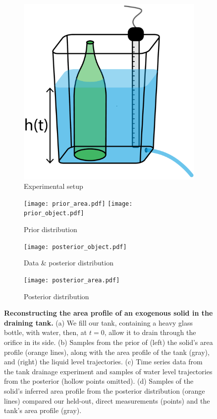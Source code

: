 \documentclass[a4paper,fleqn]{cas-dc}
\begin{document}
\begin{figure}[ht]
    \centering
        \begin{subfigure}[b]{0.2\textwidth}
    	\includegraphics[width=\textwidth]{tank_w_bottle.pdf}
	\caption{Experimental setup} \label{fig:tank_w_bottle}
    \end{subfigure}
     \begin{subfigure}[b]{0.8\textwidth}
    	\texttt{[image: prior\_area.pdf]}
	\texttt{[image: prior\_object.pdf]}
	\caption{Prior distribution} \label{fig:prior_area}
    \end{subfigure}
    
     \begin{subfigure}[b]{0.4\textwidth}
    	\texttt{[image: posterior\_object.pdf]}
	\caption{Data \& posterior distribution} \label{fig:posterior_object}
    \end{subfigure}
    \begin{subfigure}[b]{0.44\textwidth}
    	\texttt{[image: posterior\_area.pdf]}
	\caption{Posterior distribution} \label{fig:posterior_area}
    \end{subfigure}
    \caption{
      \textbf{Reconstructing the area profile of an exogenous solid in the draining tank.} 
      (a) We fill our tank, containing a heavy glass bottle, with water, then, at $t=0$, allow it to drain through the orifice in its side.
      (b) Samples from the prior of (left) the solid's area profile (orange lines), along with the area profile of the tank (gray), and (right) the liquid level trajectories.
      (c) Time series data from the tank drainage experiment and samples of water level trajectories from the posterior (hollow points omitted).
      (d) Samples of the solid's inferred area profile from the posterior distribution (orange lines) compared our held-out, direct measurements (points) and the tank's area profile (gray).
      }
\end{figure}
\end{document}
